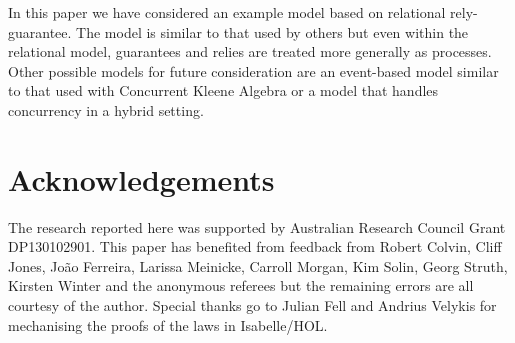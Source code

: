 \documentclass[fleqn]{fac}
\begin{document}
In this paper we have considered an example model based on relational rely-guarantee. 
The model is similar to that used by others \cite{CoJo07,BoerHannemanDeRoever99,Dingel02,DeRoever01,HayesJonesColvin14TR}
but even within the relational model, guarantees and relies are treated more generally as processes.
Other possible models for future consideration are an event-based model
similar to that used with Concurrent Kleene Algebra \cite{DBLP:journals/jlp/HoareMSW11}
or a model that handles concurrency in a hybrid setting.






\section*{Acknowledgements}

The research reported here was supported by
Australian Research Council Grant DP130102901.
This paper has benefited from feedback from
Robert Colvin,
Cliff Jones,
Jo\~{a}o Ferreira,
Larissa Meinicke, 
Carroll Morgan,
Kim Solin,
Georg Struth,
Kirsten Winter
and the anonymous referees 
but the remaining errors are all courtesy of the author.
Special thanks go to Julian Fell and Andrius Velykis for mechanising the proofs of the laws in Isabelle/HOL.





\newpage
{\small
\printindex
}
\end{document}
